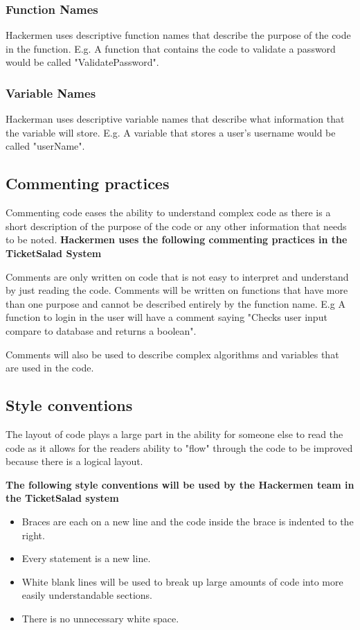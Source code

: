 \documentclass[11pt]{article}
\begin{document}
	\subsubsection{Function Names}
	Hackermen uses descriptive function names that describe the purpose of the code in the function. E.g. A function that contains the code to validate a password would be called "ValidatePassword".
	\subsubsection{Variable Names}
	Hackerman uses descriptive variable names that describe what information that the variable will store. E.g. A variable that stores a user's username would be called "userName".
	\subsection{Commenting practices}
	Commenting code eases the ability to understand complex code as there is a short description of the purpose of the code or any other information that needs to be noted. \textbf{Hackermen uses the following commenting practices in the TicketSalad System}
	
	Comments are only written on code that is not easy to interpret and understand by just reading the code. Comments will be written on functions that have more than one purpose and cannot be described entirely by the function name. E.g A function to login in the user will have a comment saying "Checks user input compare to database and returns a boolean". 
	
	Comments will also be used to describe complex algorithms and variables that are used in the code. 
	\subsection{Style conventions}
	The layout of code plays a large part in the ability for someone else to read the code as it allows for the readers ability to "flow" through the code to be improved because there is a logical layout.
	
	
	\textbf{The following style conventions will be used  by the Hackermen team in the TicketSalad system}
	\newpage
	\begin{itemize}
		\item Braces are each on a new line and the code inside the brace is indented to the right.
		\item Every statement is a new line.
		\item White blank lines will be used to break up large amounts of code into more easily understandable sections.
		\item There is no unnecessary white space.
	\end{itemize}
\end{document}

